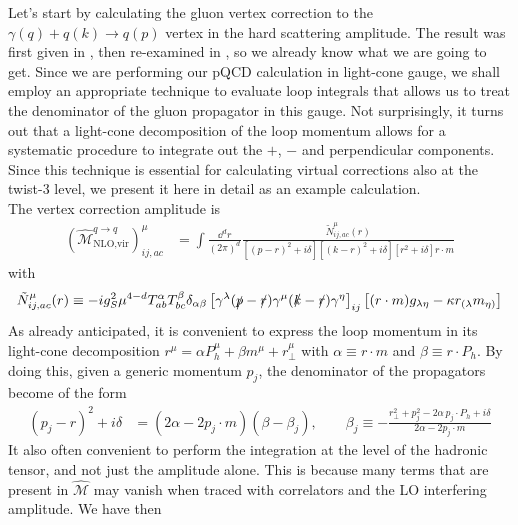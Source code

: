 Let's start by calculating the gluon vertex correction to the $\gamma(q)+q(k)\to q(p)$ vertex in the hard scattering amplitude. The result was first given in \cite{altarelli_large_1979}, then re-examined in \cite{hinderer_single-inclusive_2015}, so we already know what we are going to get. Since we are performing our pQCD calculation in light-cone gauge, we shall employ an appropriate technique to evaluate loop integrals that allows us to treat the denominator of the gluon propagator in this gauge. Not surprisingly, it turns out that a light-cone decomposition of the loop momentum allows for a systematic procedure to integrate out the $+$, $-$ and perpendicular components. Since this technique is essential for calculating virtual corrections also at the twist-3 level, we present it here in detail as an example calculation. \\ 
The vertex correction amplitude is
\begin{equation}\label{eq:amplitudevirtualtwist2}
\begin{aligned}
     (\hat{\mathcal{M}}^{q \to q}_{\text{NLO,vir}})^\mu_{ij,ac} &= \int\frac{\dd ^dr}{(2\pi)^d}\frac{\tilde N^\mu_{ij,ac}(r)}{[(p-r)^2+i\delta][(k-r)^2+i\delta][r^2+i\delta]r \cdot m}
\end{aligned}
\end{equation}
with
\begin{equation}
    \tilde N^\mu_{ij,ac}(r) \equiv -ig_S^2\mu^{4-d}T^\alpha_{ab} T^\beta_{bc}\delta_{\alpha\beta}\left[\gamma^\lambda(\slashed{p}-\slashed{r})\gamma^\mu(\slashed{k}-\slashed{r})\gamma^\eta\right]_{ij}\left[(r\cdot m)g_{\lambda\eta}-\kappa r_{(\lambda} m_{\eta)}\right]
\end{equation}
As already anticipated, it is convenient to express the loop momentum in its light-cone decomposition $r^\mu = \alpha P_h^\mu+\beta m^\mu+r_\perp^\mu$ with $\alpha\equiv r\cdot m$ and $\beta\equiv r\cdot P_h$. By doing this, given a generic momentum $p_j$, the denominator of the propagators become of the form
\begin{equation}\label{eq:beta pole beta_j}
\begin{aligned}
        (p_j-r)^2+i\delta&=(2\alpha-2p_j \cdot m)(\beta - \beta_j),\qquad \beta_j\equiv -\frac{r_\perp^2+p_j^2-2\alpha \,p_j\cdot P_h+i\delta}{2\alpha-2p_j\cdot m}
\end{aligned}
\end{equation}
It also often convenient to perform the integration at the level of the hadronic tensor, and not just the amplitude alone. This is because many terms that are present in $\hat{\mathcal{M}}$ may vanish when traced with correlators and the LO interfering amplitude. We have then

